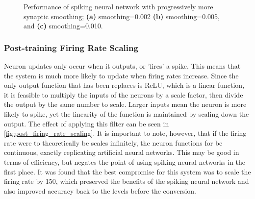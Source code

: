 \begin{figure}[htb]%
    \centering
    \qquad
    \qquad
    \caption{Performance of spiking neural network with progressively more synaptic smoothing; \textbf{(a)} smoothing=0.002 \textbf{(b)} smoothing=0.005, and \textbf{(c)} smoothing=0.010.}%
    \label{fig:post_synaptic_smoothing}%
\end{figure}

\subsubsection{Post-training Firing Rate Scaling}

Neuron updates only occur when it outputs, or 'fires' a spike. This means that the system is much more likely to update when firing rates increase. Since the only output function that has been replaces is ReLU, which is a linear function, it is feasible to multiply the inputs of the neurons by a scale factor, then divide the output by the same number to scale. Larger inputs mean the neuron is more likely to spike, yet the linearity of the function is maintained by scaling down the output. The effect of applying this filter can be seen in \cref{fig:post_firing_rate_scaling}. It is important to note, however, that if the firing rate were to theoretically be scales infinitely, the neuron functions for be continuous, exactly replicating artificial neural networks. This may be good in terms of efficiency, but negates the point of using spiking neural networks in the first place. It was found that the best compromise for this system was to scale the firing rate by 150, which preserved the benefits of the spiking neural network and also improved accuracy back to the levels before the conversion.

